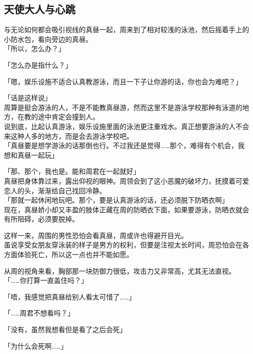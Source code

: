 \subsection{天使大人与心跳}

与无论如何都会吸引视线的真昼一起，周来到了相对较浅的泳池，然后摇着手上的小防水包，看向旁边的真昼。\\

「所以，怎么办？」

「怎么办是指什么？」

「嗯，娱乐设施不适合认真教游泳，而且一下子让你游的话，你也会为难吧？」

「话是这样说」\\

周算是挺会游泳的人，不是不能教真昼游，然而这里不是游泳学校那种有泳道的地方，在教的途中肯定会撞到人。\\

说到底，比起认真游泳，娱乐设施里面的泳池更注重戏水。真正想要游泳的人不会来这种人多的地方，而是会去游泳学校吧。\\

「真昼要是想学游泳的话那倒也行。不过我还是觉得……那个，难得有个机会，我想和真昼一起玩」

「那、那个，我也是。能和周君在一起就好」\\

真昼把身体靠过来，露出仰视的眼神。周领会到了这小恶魔的破坏力，抚摸着可爱恋人的头，渐渐给自己找回冷静。\\

「那就一起休闲地玩吧。那个，要是认真游泳的话，还必须脱下防晒衣啊」\\

现在，真昼娇小却又丰盈的肢体正藏在周的防晒衣下面，如果要游泳，防晒衣就会有所阻碍，必须要脱掉。

这样一来，周围的男性恐怕会看真昼，周或许也得避开目光。\\

虽说享受女朋友穿泳装的样子是男方的权利，但要是注视太长时间，周恐怕会在各方面体验死亡，所以这一点也并不能如愿。

从周的视角来看，胸部那一块防御力很低，攻击力又非常高，尤其无法直视。\\

「……你打算一直盖住吗？」

「唔，我感觉把真昼给别人看太可惜了……」

「……周君不想看吗？」

「没有，虽然我想看但是看了之后会死」

「为什么会死啊……」\\

